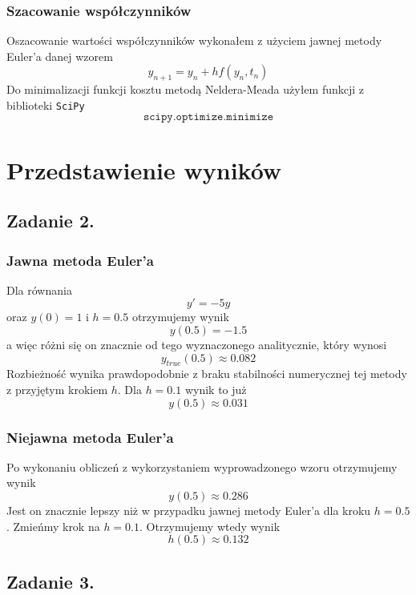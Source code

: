\documentclass[11pt, leqno]{scrartcl}
\begin{document}
    \subsubsection{Szacowanie współczynników}
    Oszacowanie wartości współczynników wykonałem z użyciem
    jawnej metody Euler'a danej wzorem
    \[
        y_{n+1}=y_n+hf(y_n,t_n)
    \]
    Do minimalizacji funkcji kosztu metodą Neldera-Meada użyłem
    funkcji z biblioteki \texttt{SciPy}
    \[
        \texttt{scipy.optimize.minimize}
    \]
    
    \section{Przedstawienie wyników}
    \subsection{Zadanie 2.}
    \subsubsection{Jawna metoda Euler'a}
    Dla równania
    \[
        y'=-5y
    \]
    oraz $y(0)=1$ i $h=0.5$ otrzymujemy wynik
    \[
        y(0.5)=-1.5
    \]
    a więc różni się on znacznie od tego wyznaczonego
    analitycznie, który wynosi
    \[
        y_{true}(0.5) \approx 0.082
    \]
    Rozbieżność wynika prawdopodobnie z braku stabilności
    numerycznej tej metody z przyjętym krokiem $h$. Dla
    $h=0.1$ wynik to już
    \[
        y(0.5) \approx 0.031
    \]

    \subsubsection{Niejawna metoda Euler'a}
    Po wykonaniu obliczeń z wykorzystaniem wyprowadzonego
    wzoru otrzymujemy wynik
    \[
        y(0.5) \approx 0.286
    \]
    Jest on znacznie lepszy niż w przypadku jawnej
    metody Euler'a dla kroku $h=0.5$. Zmieńmy krok
    na $h=0.1$. Otrzymujemy wtedy wynik
    \[
        h(0.5) \approx 0.132
    \]
    \subsection{Zadanie 3.}
\end{document}

